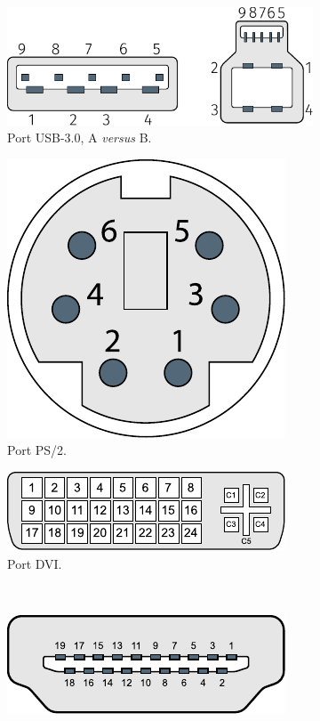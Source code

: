 \begin{figure}[!hb]
	\begin{subfigure}[b]{0.35\linewidth}\Centering
		\includegraphics[width=0.9\linewidth]{./Images/Chapter01/figI-01a-usb3.pdf}
		\caption{\label{fig:I.1a}Port USB-3.0, A \emph{versus} B.}
	\end{subfigure}\hfill
	\begin{subfigure}[b]{0.3\linewidth}\Centering
		\includegraphics[width=0.40\linewidth]{./Images/Chapter01/figI-01b-ps2.pdf}
		\caption{\label{fig:I.1b}Port PS/2.}
	\end{subfigure}\hfill
	\begin{subfigure}[b]{0.3\linewidth}\Centering
		\includegraphics[width=0.70\linewidth]{./Images/Chapter01/figI-01c-dvi.pdf}
		\caption{\label{fig:I.1c}Port DVI.}
	\end{subfigure}\\[8pt]
	\begin{subfigure}[b]{0.35\linewidth}\Centering
		\includegraphics[width=0.65\linewidth]{./Images/Chapter01/figI-01d-hdmi.pdf}

\end{subfigure}
\end{figure}
